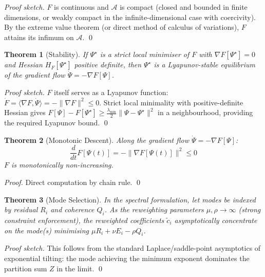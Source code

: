 \documentclass[12pt]{article}
\newtheorem{theorem}{Theorem}
\begin{document}
\begin{proof}[Proof sketch]
$F$ is continuous and $\mathcal{A}$ is compact (closed and bounded in finite dimensions, or weakly compact in the infinite-dimensional case with coercivity). By the extreme value theorem (or direct method of calculus of variations), $F$ attains its infimum on $\mathcal{A}$. \qed
\end{proof}

\begin{theorem}[Stability]
If $\Psi^{\star}$ is a strict local minimiser of $F$ with $\nabla F[\Psi^{\star}] = 0$ and Hessian $H_F[\Psi^{\star}]$ positive definite, then $\Psi^{\star}$ is a Lyapunov-stable equilibrium of the gradient flow $\dot{\Psi} = -\nabla F[\Psi]$.
\end{theorem}

\begin{proof}[Proof sketch]
$F$ itself serves as a Lyapunov function: $\dot{F} = \langle \nabla F, \dot{\Psi}\rangle = -\|\nabla F\|^2 \leq 0$. Strict local minimality with positive-definite Hessian gives $F[\Psi] - F[\Psi^{\star}] \geq \frac{\lambda_{\min}}{2}\|\Psi - \Psi^{\star}\|^2$ in a neighbourhood, providing the required Lyapunov bound. \qed
\end{proof}

\begin{theorem}[Monotonic Descent]
Along the gradient flow $\dot{\Psi} = -\nabla F[\Psi]$:
\begin{equation}
\frac{d}{dt} F[\Psi(t)] = -\|\nabla F[\Psi(t)]\|^2 \leq 0
\end{equation}
$F$ is monotonically non-increasing.
\end{theorem}

\begin{proof}
Direct computation by chain rule. \qed
\end{proof}

\begin{theorem}[Mode Selection]
In the spectral formulation, let modes be indexed by residual $R_i$ and coherence $Q_i$. As the reweighting parameters $\mu, \rho \to \infty$ (strong constraint enforcement), the reweighted coefficients $\tilde{c}_i$ asymptotically concentrate on the mode(s) minimising $\mu R_i + \nu E_i - \rho Q_i$.
\end{theorem}

\begin{proof}[Proof sketch]
This follows from the standard Laplace/saddle-point asymptotics of exponential tilting: the mode achieving the minimum exponent dominates the partition sum $Z$ in the limit. \qed
\end{proof}
\end{document}
